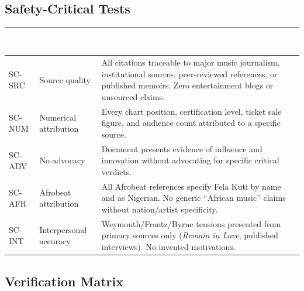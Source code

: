 \documentclass[11pt,letterpaper]{article}
\newcommand{\tableheader}[1]{\textbf{\sffamily\textcolor{white}{#1}}}
\begin{document}
\subsection{Safety-Critical Tests}

\begin{center}
\begin{tabularx}{\textwidth}{C{1.5cm}L{3.5cm}X}
\toprule
{}
\tableheader{Test ID} & \tableheader{Verifies} & \tableheader{Expected Behavior} \\
\midrule
SC-SRC & Source quality & All citations traceable to major music journalism, institutional sources, peer-reviewed references, or published memoirs. Zero entertainment blogs or unsourced claims. \\
SC-NUM & Numerical attribution & Every chart position, certification level, ticket sale figure, and audience count attributed to a specific source. \\
SC-ADV & No advocacy & Document presents evidence of influence and innovation without advocating for specific critical verdicts. \\
SC-AFR & Afrobeat attribution & All Afrobeat references specify Fela Kuti by name and as Nigerian. No generic ``African music'' claims without nation/artist specificity. \\
SC-INT & Interpersonal accuracy & Weymouth/Frantz/Byrne tensions presented from primary sources only (\textit{Remain in Love}, published interviews). No invented motivations. \\
\bottomrule
\end{tabularx}
\end{center}

\subsection{Verification Matrix}
\end{document}
